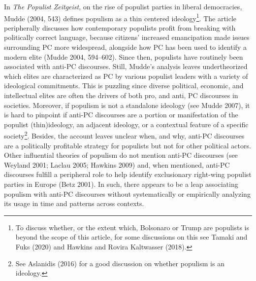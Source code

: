 \documentclass[
  12pt,
]{article}
\begin{document}
In \emph{The Populist Zeitgeist}, on the rise of populist parties in
liberal democracies, Mudde (2004, 543) defines populism as a thin
centered ideology\footnote{ To discuss whether, or the extent which,
  Bolsonaro or Trump are populists is beyond the scope of this article,
  for some discussions on this see Tamaki and Fuks (2020) and Hawkins
  and Rovira Kaltwasser (2018).}. The article peripherally discusses how
contemporary populists profit from breaking with politically correct
language, because citizens' increased emancipation made issues
surrounding PC more widespread, alongside how PC has been used to
identify a modern elite (Mudde 2004, 594--602). Since then, populists
have routinely been associated with anti-PC discourses. Still, Mudde's
analysis leaves undertheorized which elites are characterized as PC by
various populist leaders with a variety of ideological commitments. This
is puzzling since diverse political, economic, and intellectual elites
are often the drivers of both pro, and anti, PC discourses in societies.
Moreover, if populism is not a standalone ideology (see Mudde 2007), it
is hard to pinpoint if anti-PC discourses are a portion or manifestation
of the populist (thin)ideology, an adjacent ideology, or a contextual
feature of a specific society\footnote{ See Aslanidis (2016) for a good
  discussion on whether populism is an ideology.}. Besides, the account
leaves unclear when, and why, anti-PC discourses are a politically
profitable strategy for populists but not for other political actors.
Other influential theories of populism do not mention anti-PC discourses
(see Weyland 2001; Laclau 2005; Hawkins 2009) and, when mentioned,
anti-PC discourses fulfill a peripheral role to help identify
exclusionary right-wing populist parties in Europe (Betz 2001). In such,
there appears to be a leap associating populism with anti-PC discourses
without systematically or empirically analyzing its usage in time and
patterns across contexts.
\end{document}
